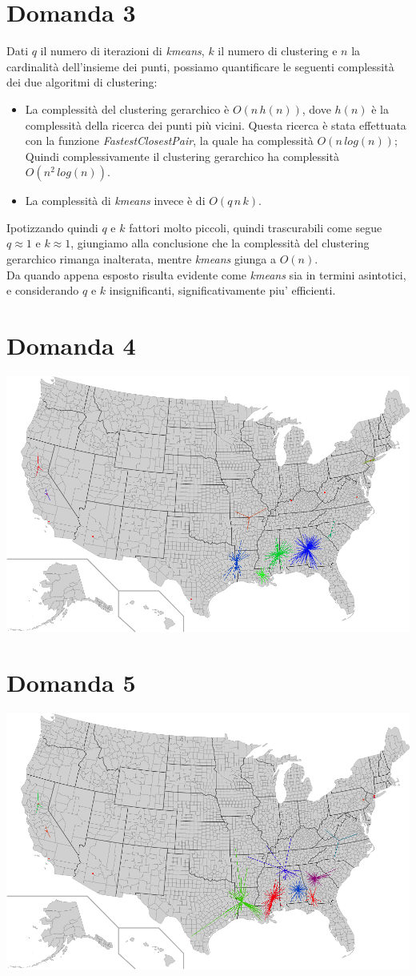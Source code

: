 \documentclass{article}
\begin{document}
\section*{Domanda 3}
Dati $q$ il numero di iterazioni di \textit{kmeans}, $k$ il numero di clustering e $n$ la cardinalità dell'insieme dei punti, possiamo quantificare le seguenti complessità dei due algoritmi di clustering:
\begin{itemize}
\item La complessità del clustering gerarchico è $O(n\,h(n))$, dove $h(n)$ è la complessità della ricerca dei punti più vicini.
Questa ricerca è stata effettuata con la funzione \textit{FastestClosestPair}, la quale ha complessità $O(n\,log(n))$;
Quindi complessivamente il clustering gerarchico ha complessità $O(n^2\,log(n))$.
\item La complessità di \textit{kmeans} invece è di $O(q\,n\,k)$. 
\end{itemize}

\noindent Ipotizzando quindi $q$ e $k$ fattori molto piccoli, quindi trascurabili come segue $q \approx 1$ e $k \approx 1$, giungiamo alla conclusione che 
la complessità del clustering gerarchico rimanga inalterata, mentre \textit{kmeans} giunga a $O(n)$.\\
Da quando appena esposto risulta evidente come \textit{kmeans} sia in termini asintotici, e considerando $q$ e $k$ insignificanti, significativamente piu' efficienti.

\section*{Domanda 4}
\includegraphics[width=1.0\linewidth, valign=t]{figures/Domanda4}

\section*{Domanda 5}
\includegraphics[width=1.0\linewidth, valign=t]{figures/Domanda5}
\end{document}
